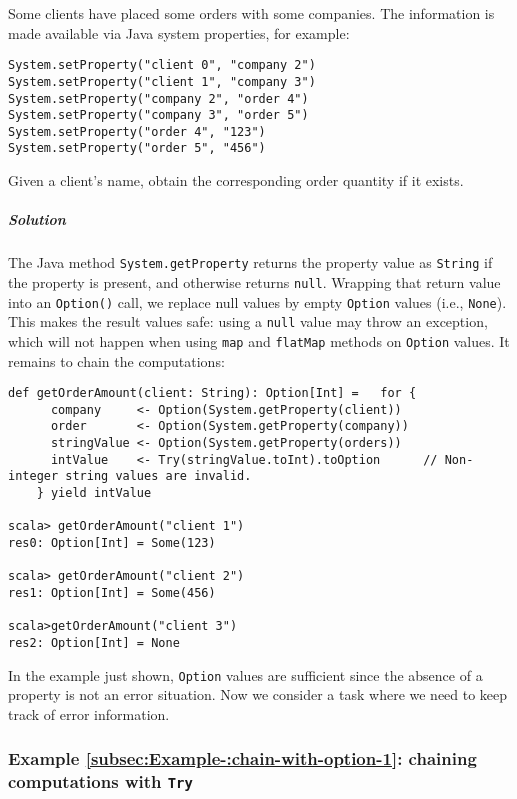 Some clients have placed some orders with some companies. The information
is made available via Java system properties, for example:
\begin{lstlisting}
System.setProperty("client 0", "company 2")
System.setProperty("client 1", "company 3")
System.setProperty("company 2", "order 4")
System.setProperty("company 3", "order 5")
System.setProperty("order 4", "123")
System.setProperty("order 5", "456")
\end{lstlisting}
Given a client\textsf{'}s name, obtain the corresponding order quantity if
it exists.

\subparagraph{Solution}

The Java method \lstinline!System.getProperty! returns the property
value as \lstinline!String! if the property is present, and otherwise
returns \lstinline!null!. Wrapping that return value into an \lstinline!Option()!
call, we replace null values by empty \lstinline!Option! values (i.e.,
\lstinline!None!). This makes the result values safe: using a \lstinline!null!
value may throw an exception, which will not happen when using \lstinline!map!
and \lstinline!flatMap! methods on \lstinline!Option! values. It
remains to chain the computations:

\begin{lstlisting}
def getOrderAmount(client: String): Option[Int] =   for {
      company     <- Option(System.getProperty(client))
      order       <- Option(System.getProperty(company))
      stringValue <- Option(System.getProperty(orders))
      intValue    <- Try(stringValue.toInt).toOption      // Non-integer string values are invalid.
    } yield intValue

scala> getOrderAmount("client 1")
res0: Option[Int] = Some(123)

scala> getOrderAmount("client 2")
res1: Option[Int] = Some(456)

scala>getOrderAmount("client 3")
res2: Option[Int] = None
\end{lstlisting}

In the example just shown, \lstinline!Option! values are sufficient
since the absence of a property is not an error situation. Now we
consider a task where we need to keep track of error information.

\subsubsection{Example \label{subsec:Example-:chain-with-option-1}\ref{subsec:Example-:chain-with-option-1}:
chaining computations with \texttt{Try}}

